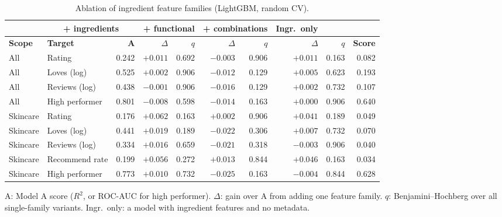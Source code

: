 \begin{table}[htbp]
\centering
\small
\begin{tabular}{|l|l|r|r|r|r|r|r|r|r|}
\hline
\rowcolor{headfill} \multicolumn{3}{|c|}{} & \multicolumn{2}{c|}{\textbf{+ ingredients}} & \multicolumn{2}{c|}{\textbf{+ functional}} & \multicolumn{2}{c|}{\textbf{+ combinations}} & \multicolumn{1}{c|}{\textbf{Ingr.\ only}} \\
\hline
\rowcolor{headfill} \textbf{Scope} & \textbf{Target} & \textbf{A} & \textbf{$\Delta$} & \textbf{$q$} & \textbf{$\Delta$} & \textbf{$q$} & \textbf{$\Delta$} & \textbf{$q$} & \textbf{Score} \\
\hline
All & Rating & 0.242 & $+0.011$ & 0.692 & $-0.003$ & 0.906 & $+0.011$ & 0.163 & 0.082 \\
\hline
All & Loves (log) & 0.525 & $+0.002$ & 0.906 & $-0.012$ & 0.129 & $+0.005$ & 0.623 & 0.193 \\
\hline
All & Reviews (log) & 0.438 & $-0.001$ & 0.906 & $-0.016$ & 0.129 & $+0.002$ & 0.732 & 0.107 \\
\hline
All & High performer & 0.801 & $-0.008$ & 0.598 & $-0.014$ & 0.163 & $+0.000$ & 0.906 & 0.640 \\
\hline
\hline
Skincare & Rating & 0.176 & $+0.062$ & 0.163 & $+0.002$ & 0.906 & $+0.041$ & 0.189 & 0.049 \\
\hline
Skincare & Loves (log) & 0.441 & $+0.019$ & 0.189 & $-0.022$ & 0.306 & $+0.007$ & 0.732 & 0.070 \\
\hline
Skincare & Reviews (log) & 0.334 & $+0.016$ & 0.659 & $-0.021$ & 0.318 & $-0.003$ & 0.906 & 0.040 \\
\hline
Skincare & Recommend rate & 0.199 & $+0.056$ & 0.272 & $+0.013$ & 0.844 & $+0.046$ & 0.163 & 0.034 \\
\hline
Skincare & High performer & 0.773 & $+0.010$ & 0.732 & $-0.025$ & 0.163 & $-0.004$ & 0.844 & 0.628 \\
\hline
\end{tabular}
\par\smallskip
\parbox{0.95\linewidth}{\footnotesize A: Model A score ($R^2$, or ROC-AUC for high performer). $\Delta$: gain over A from adding one feature family. $q$: Benjamini--Hochberg over all single-family variants. Ingr.\ only: a model with ingredient features and no metadata.}
\caption{Ablation of ingredient feature families (LightGBM, random CV).}
\label{tab:ablation}
\end{table}
